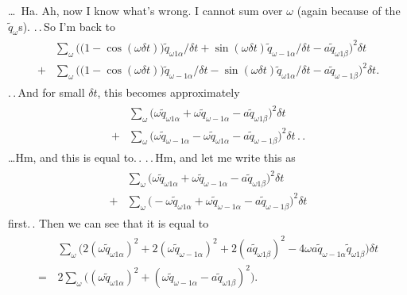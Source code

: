 \documentclass{report}
\begin{document}
\ldots\ Ha. Ah, now I know what's wrong. I cannot sum over $\omega$ (again because of the $\tilde q_\omega$s). .\,.\,So I'm back to
\begin{align}
\begin{aligned}
	&\sum_{\omega}
		\Big(
			\big(1 - \cos(\omega\delta t)\big) \tilde q_{\omega 1\alpha}  / \delta t +
			\sin(\omega\delta t) \tilde q_{\omega-1\alpha} / \delta t -
			a \tilde q_{\omega 1\beta}
		\Big)^2 
		\delta t\\
	+&\sum_{\omega}
		\Big(
			\big(1 - \cos(\omega\delta t)\big) \tilde q_{\omega-1\alpha}  / \delta t -
			\sin(\omega\delta t) \tilde q_{\omega 1\alpha} / \delta t -
			a \tilde q_{\omega-1\beta}
		\Big)^2 
		\delta t.
\end{aligned}
\end{align}
.\,.\,And for small $\delta t$, this becomes approximately
\begin{align}
\begin{aligned}
	&\sum_{\omega}
		\Big(
			\omega \tilde q_{\omega 1\alpha} +
			\omega \tilde q_{\omega-1\alpha} -
			a \tilde q_{\omega 1\beta}
		\Big)^2 
		\delta t\\
	+&\sum_{\omega}
		\Big(
			\omega \tilde q_{\omega-1\alpha} -
			\omega \tilde q_{\omega 1\alpha} -
			a \tilde q_{\omega-1\beta}
		\Big)^2 
		\delta t\,.\,.
\end{aligned}
\end{align}
\ldots Hm, and this is equal to.\,. .\,.\,Hm, and let me write this as 
\begin{align}
\begin{aligned}
	&\sum_{\omega}
		\Big(
			\omega \tilde q_{\omega 1\alpha} +
			\omega \tilde q_{\omega-1\alpha} -
			a \tilde q_{\omega 1\beta}
		\Big)^2 
		\delta t\\
	+&\sum_{\omega}
		\Big(
			-\omega \tilde q_{\omega 1\alpha} +
			\omega \tilde q_{\omega-1\alpha} -
			a \tilde q_{\omega-1\beta}
		\Big)^2 
		\delta t
\end{aligned}
\end{align}
first.\,. Then we can see that it is equal to
\begin{align}
\begin{aligned}
	&\,\sum_{\omega} \Big(
		2(\omega \tilde q_{\omega 1\alpha})^2 
		+
		2(\omega \tilde q_{\omega-1\alpha})^2
		+
		2(a \tilde q_{\omega 1\beta})^2
		-
		4 \omega a \tilde q_{\omega-1\alpha} \tilde q_{\omega 1\beta}
	\Big)
	\delta t \\
	=&\,2\sum_{\omega} \Big(
		(\omega \tilde q_{\omega 1\alpha})^2 +
		(\omega \tilde q_{\omega-1\alpha} - a \tilde q_{\omega 1\beta})^2
	\Big).
\end{aligned}
\end{align}
\end{document}
